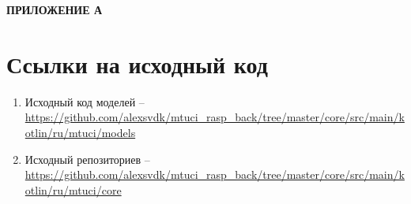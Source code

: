 \newpage
\begin{center}
  \textbf{\large ПРИЛОЖЕНИЕ А}
\end{center}

\section{Ссылки на исходный код}

\begin{enumerate}

  \item
  Исходный код моделей -- 
  \url{https://github.com/alexsvdk/mtuci_rasp_back/tree/master/core/src/main/kotlin/ru/mtuci/models} 
  \label{code:models}

  \item
  Исходный репозиториев -- 
  \url{https://github.com/alexsvdk/mtuci_rasp_back/tree/master/core/src/main/kotlin/ru/mtuci/core} 
  \label{code:repo}

\end{enumerate}